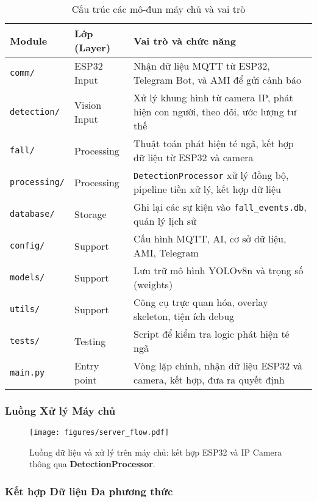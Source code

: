 \begin{table}[H]
\centering
\caption{Cấu trúc các mô-đun máy chủ và vai trò}
\label{tab:server_modules}
\begin{tabular}{|l|l|p{7cm}|}
\hline
\textbf{Module} & \textbf{Lớp (Layer)} & \textbf{Vai trò và chức năng} \\
\hline
\texttt{comm/} & ESP32 Input & Nhận dữ liệu MQTT từ ESP32, Telegram Bot, và AMI để gửi cảnh báo \\
\hline
\texttt{detection/} & Vision Input & Xử lý khung hình từ camera IP, phát hiện con người, theo dõi, ước lượng tư thế \\
\hline
\texttt{fall/} & Processing & Thuật toán phát hiện té ngã, kết hợp dữ liệu từ ESP32 và camera \\
\hline
\texttt{processing/} & Processing & \texttt{DetectionProcessor} xử lý đồng bộ, pipeline tiền xử lý, kết hợp dữ liệu \\
\hline
\texttt{database/} & Storage & Ghi lại các sự kiện vào \texttt{fall\_events.db}, quản lý lịch sử \\
\hline
\texttt{config/} & Support & Cấu hình MQTT, AI, cơ sở dữ liệu, AMI, Telegram \\
\hline
\texttt{models/} & Support & Lưu trữ mô hình YOLOv8n và trọng số (weights) \\
\hline
\texttt{utils/} & Support & Công cụ trực quan hóa, overlay skeleton, tiện ích debug \\
\hline
\texttt{tests/} & Testing & Script để kiểm tra logic phát hiện té ngã \\
\hline
\texttt{main.py} & Entry point & Vòng lặp chính, nhận dữ liệu ESP32 và camera, kết hợp, đưa ra quyết định \\
\hline
\end{tabular}
\end{table}

\subsubsection{Luồng Xử lý Máy chủ}
\label{subsubsec:server_flow}


\begin{figure}[H]
\centering
\texttt{[image: figures/server\_flow.pdf]}
\caption{Luồng dữ liệu và xử lý trên máy chủ: kết hợp ESP32 và IP Camera thông qua \textbf{DetectionProcessor}.}
\label{fig:server_flow}
\end{figure}
\subsubsection{Kết hợp Dữ liệu Đa phương thức}
\label{subsubsec:multi_input_fusion}

